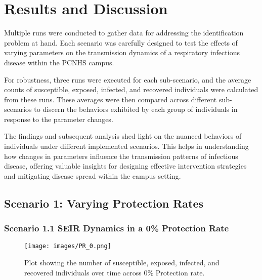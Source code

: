 \chapter{Results and Discussion}
\label{chap:Results and Discussion}

\indent \indent Multiple runs were conducted to gather data for addressing the identification problem at hand. Each scenario was carefully designed to test the effects of varying parameters on the transmission dynamics of a respiratory infectious disease within the PCNHS campus.

For robustness, three runs were executed for each sub-scenario, and the average counts of susceptible, exposed, infected, and recovered individuals were calculated from these runs. These averages were then compared across different sub-scenarios to discern the behaviors exhibited by each group of individuals in response to the parameter changes.

The findings and subsequent analysis shed light on the nuanced behaviors of individuals under different implemented scenarios. This helps in understanding how changes in parameters influence the transmission patterns of infectious disease, offering valuable insights for designing effective intervention strategies and mitigating disease spread within the campus setting.


\section{ Scenario 1: Varying Protection Rates}
\label{S1}

\subsection{ Scenario 1.1 SEIR Dynamics in a 0\% Protection Rate}
\begin{figure}[H]
	\centering
	\texttt{[image: images/PR\_0.png]}
	\caption{Plot showing the number of susceptible, exposed, infected, and recovered individuals over time across 0\% Protection rate. }
	\label{fig:10}
\end{figure}

